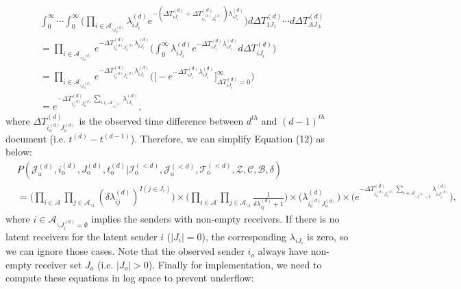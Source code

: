 \documentclass[a4paper]{article}
\begin{document}
\begin{equation}
\begin{aligned}
&\int_{0}^\infty\cdots\int_{0}^\infty \Big(\prod_{i\in \mathcal{A}_{\backslash i_o^{(d)}}} \lambda^{(d)}_{iJ_i}e^{-(\Delta T^{(d)}_{iJ_i} + \Delta T^{(d)}_{i_o^{(d)}J_o^{(d)}})\lambda^{(d)}_{iJ_i}} \Big)d\Delta T^{(d)}_{1J_1}\cdots d\Delta T^{(d)}_{AJ_A}\\&
= \prod_{i\in \mathcal{A}_{\backslash i_o^{(d)}}} e^{- \Delta T^{(d)}_{i_o^{(d)}J_o^{(d)}}\lambda^{(d)}_{iJ_i}} \Big(\int_{0}^\infty \lambda^{(d)}_{iJ_i}e^{-\Delta T^{(d)}_{iJ_i} \lambda^{(d)}_{iJ_i}}  d\Delta T^{(d)}_{iJ_i}\Big)
\\& =\prod_{i\in \mathcal{A}_{\backslash i_o^{(d)}}} e^{- \Delta T^{(d)}_{i_o^{(d)}J_o^{(d)}}\lambda^{(d)}_{iJ_i}} \Big(\Big [ - e^{-\Delta T^{(d)}_{iJ_i} \lambda^{(d)}_{iJ_i}}\Big]_{\Delta T^{(d)}_{iJ_i}  = 0} ^{\infty}\Big)
\\& = e^{- \Delta T^{(d)}_{i_o^{(d)}J_o^{(d)}}\sum_{i\in \mathcal{A}_{\backslash i_o^{(d)}}}\lambda^{(d)}_{iJ_i}},
\end{aligned}
\end{equation}
where $\Delta T^{(d)}_{i_o^{(d)}J_o^{(d)}}$ is the observed time difference between $d^{th}$ and $(d-1)^{th}$ document (i.e. $t^{(d)}-t^{(d-1)}$).
Therefore, we can simplify Equation (12) as below:
  \begin{equation}
  \begin{aligned}
  &P(\mathcal{J}^{(d)}_{\mbox{a}}, i^{(d)}_{\mbox{o}}, J^{(d)}_{\mbox{o}}, t^{(d)}_{\mbox{o}} |\mathcal{I}^{(<d)}_{\mbox{o}}, \mathcal{J}^{(<d)}_{\mbox{o}}, \mathcal{T}^{(<d)}_{\mbox{o}}, \mathcal{Z}, \mathcal{C}, \mathcal{B}, \delta)\\&=\Big(\prod_{i\in \mathcal{A}}\prod_{j \in \mathcal{A}_{\backslash i }} (\delta\lambda^{(d)}_{ij})^{I(j \in J_i)}\Big) \times \Big(\prod_{i\in \mathcal{A}}\prod_{j \in \mathcal{A}_{\backslash i }} \frac{1}{\delta\lambda^{(d)}_{ij}+1}\Big)\times \Big(\lambda^{(d)}_{i_o^{(d)}J_{o}^{(d)}}\Big)\times  \Big(e^{-\Delta T^{(d)}_{i_o^{(d)}J_o^{(d)}}\sum\limits_{i\in \mathcal{A}_{\backslash J^{(d)}_i = \emptyset}}\lambda^{(d)}_{iJ^{(d)}_{i}}}\Big),
  \end{aligned}
  \end{equation}
  where ${i\in \mathcal{A}_{\backslash J^{(d)}_i = \emptyset}}$ implies the senders with non-empty receivers. If there is no latent receivers for the latent sender $i$ ($|J_i| = 0$), the corresponding $\lambda_{iJ_{i}}$ is zero, so we can ignore those cases. Note that the observed sender $i_o$ always have non-empty receiver set $J_o$ (i.e. $|J_o| > 0$). Finally for implementation, we need to compute these equations in log space to prevent underflow:
\end{document}
